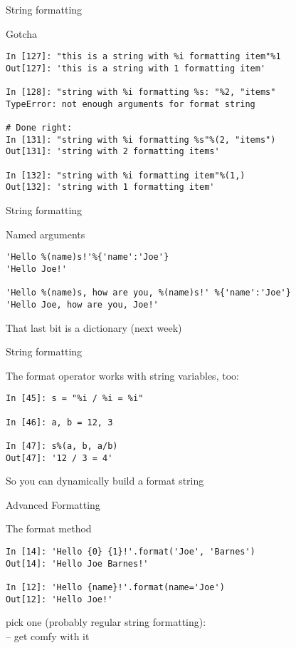 \documentclass{beamer}
\begin{document}
\begin{frame}[fragile]{String formatting}

{\Large Gotcha}

\begin{verbatim}
In [127]: "this is a string with %i formatting item"%1 
Out[127]: 'this is a string with 1 formatting item'

In [128]: "string with %i formatting %s: "%2, "items" 
TypeError: not enough arguments for format string

# Done right:
In [131]: "string with %i formatting %s"%(2, "items")
Out[131]: 'string with 2 formatting items'

In [132]: "string with %i formatting item"%(1,)
Out[132]: 'string with 1 formatting item' 
\end{verbatim}

\end{frame}

\begin{frame}[fragile]{String formatting}

{\Large Named arguments}

\begin{verbatim}
'Hello %(name)s!'%{'name':'Joe'}
'Hello Joe!'

'Hello %(name)s, how are you, %(name)s!' %{'name':'Joe'}
'Hello Joe, how are you, Joe!'
\end{verbatim}
\vfill
{\Large That last bit is a dictionary (next week) }

\end{frame}

\begin{frame}[fragile]{String formatting}

{\Large The format operator works with string variables, too:}

\begin{verbatim}
In [45]: s = "%i / %i = %i"

In [46]: a, b = 12, 3

In [47]: s%(a, b, a/b)
Out[47]: '12 / 3 = 4'
\end{verbatim}
\vfill
So you can dynamically build a format string
\end{frame}

\begin{frame}[fragile]{Advanced Formatting}

{\Large The format method}

\begin{verbatim}
In [14]: 'Hello {0} {1}!'.format('Joe', 'Barnes')
Out[14]: 'Hello Joe Barnes!'

In [12]: 'Hello {name}!'.format(name='Joe')
Out[12]: 'Hello Joe!'
\end{verbatim}
\vfill
{\Large pick one (probably regular string formatting): \\
  -- get comfy with it }

\end{frame}
\end{document}
